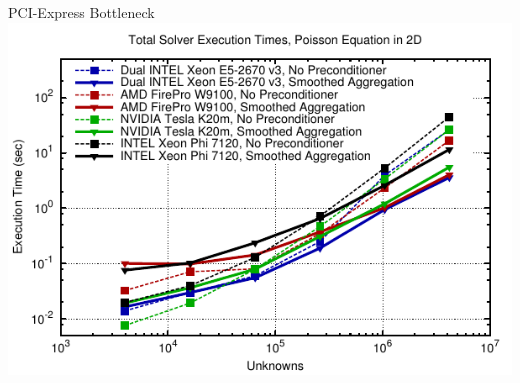\begin{frame}{PCI-Express Bottleneck}
  \includegraphics[width=1.0\textwidth]{figures/amg-vs-pure-full-2d}
\end{frame}


